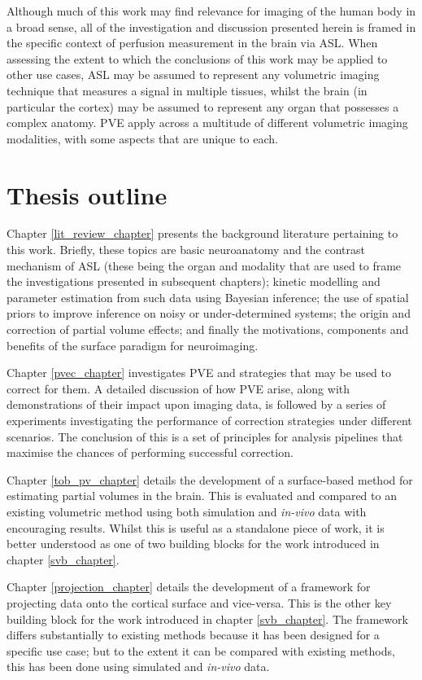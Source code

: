 \documentclass[12pt]{report}
\begin{document}
Although much of this work may find relevance for imaging of the human body in a broad sense, all of the investigation and discussion presented herein is framed in the specific context of perfusion measurement in the brain via ASL. When assessing the extent to which the conclusions of this work may be applied to other use cases, ASL may be assumed to represent any volumetric imaging technique that measures a signal in multiple tissues, whilst the brain (in particular the cortex) may be assumed to represent any organ that possesses a complex anatomy. PVE apply across a multitude of different volumetric imaging modalities, with some aspects that are unique to each. 

\section{Thesis outline}

Chapter \ref{lit_review_chapter} presents the background literature pertaining to this work. Briefly, these topics are basic neuroanatomy and the contrast mechanism of ASL (these being the organ and modality that are used to frame the investigations presented in subsequent chapters); kinetic modelling and parameter estimation from such data using Bayesian inference; the use of spatial priors to improve inference on noisy or under-determined systems; the origin and correction of partial volume effects; and finally the motivations, components and benefits of the surface paradigm for neuroimaging. 

Chapter \ref{pvec_chapter} investigates PVE and strategies that may be used to correct for them. A detailed discussion of how PVE arise, along with demonstrations of their impact upon imaging data, is followed by a series of experiments investigating the performance of correction strategies under different scenarios. The conclusion of this is a set of principles for analysis pipelines that maximise the chances of performing successful correction. 

Chapter \ref{tob_pv_chapter} details the development of a surface-based method for estimating partial volumes in the brain. This is evaluated and compared to an existing volumetric method using both simulation and \textit{in-vivo} data with encouraging results. Whilst this is useful as a standalone piece of work, it is better understood as one of two building blocks for the work introduced in chapter \ref{svb_chapter}.  

Chapter \ref{projection_chapter} details the development of a framework for projecting data onto the cortical surface and vice-versa. This is the other key building block for the work introduced in chapter \ref{svb_chapter}. The framework differs substantially to existing methods because it has been designed for a specific use case; but to the extent it can be compared with existing methods, this has been done using simulated and \textit{in-vivo} data. 
\end{document}
